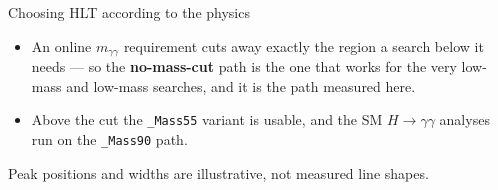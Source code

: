 \documentclass[aspectratio=169,10pt]{beamer}
\newcommand{\Hgg}{\ensuremath{H\!\to\!\gamma\gamma}}
\newcommand{\hl}[1]{\textcolor{cmsaccent}{\textbf{#1}}}
\begin{document}
\begin{frame}{Choosing HLT according to the physics}
  \vspace{4pt}
  \begin{itemize}\footnotesize\itemsep2pt
    \item An online $m_{\gamma\gamma}$ requirement cuts away exactly the region a search below it
          needs --- so the \hl{no-mass-cut} path is the one that works for the very low-mass and low-mass searches,
          and it is the path measured here.
    \item Above the cut the \texttt{\_Mass55} variant is usable, and the SM \Hgg{} analyses run on
          the \texttt{\_Mass90} path.
  \end{itemize}
  \vfill
  {\tiny\color{lightgrey} Peak positions and widths are illustrative, not measured line shapes.}
\end{frame}
\end{document}
